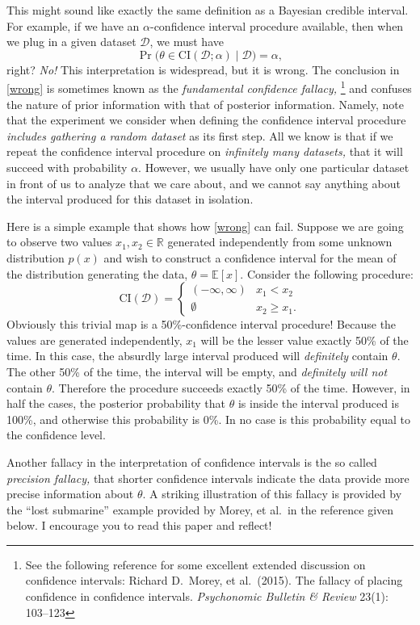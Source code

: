\documentclass{article}
\newcommand{\given}{\mid}
\newcommand{\mc}[1]{\mathcal{#1}}
\newcommand{\data}{\mc{D}}
\newcommand{\E}{\mathbb{E}}
\newcommand{\R}{\mathbb{R}}
\newcommand{\ci}{\text{CI}}
\begin{document}
This might sound like exactly the same definition as a Bayesian credible
interval. For example, if we have an $\alpha$-confidence interval procedure
available, then when we plug in a given dataset $\data$, we must have
\begin{equation}
  \Pr\bigl(\theta \in \ci(\data; \alpha) \given \data) = \alpha, \tag{$\star$}
  \label{wrong}
\end{equation}
right? \emph{No!} This interpretation is widespread, but it is wrong.  The
conclusion in \eqref{wrong} is sometimes known as the \emph{fundamental
  confidence fallacy,}%
%
\footnote{See the following reference for some excellent extended discussion on
  confidence intervals:  Richard D.\ Morey, et al.\ (2015). The fallacy of placing
  confidence in confidence intervals. \emph{Psychonomic Bulletin \& Review}
  23(1): 103--123}
%
and confuses the nature of prior information with that of posterior
information. Namely, note that the experiment we consider when defining the
confidence interval procedure \emph{includes gathering a random dataset} as its
first step. All we know is that if we repeat the confidence interval procedure
on \emph{infinitely many datasets,} that it will succeed with probability
$\alpha$. However, we usually have only one particular dataset in front of us to
analyze that we care about, and we cannot say anything about the interval
produced for this dataset in isolation.

Here is a simple example that shows how \eqref{wrong} can fail. Suppose we are
going to observe two values $x_1, x_2 \in \R$ generated independently from some
unknown distribution $p(x)$ and wish to construct a confidence interval for the
mean of the distribution generating the data, $\theta = \E[x]$. Consider the
following procedure:
\[
  \ci(\data) =
  \begin{cases}
    (-\infty, \infty) & x_1  <   x_2 \\
    \emptyset         & x_2 \geq x_1.
  \end{cases}
\]
Obviously this trivial map is a 50\%-confidence interval procedure! Because the
values are generated independently, $x_1$ will be the lesser value exactly 50\%
of the time.  In this case, the absurdly large interval produced will
\emph{definitely} contain $\theta$.  The other 50\% of the time, the interval
will be empty, and \emph{definitely will not} contain $\theta$. Therefore the
procedure succeeds exactly 50\% of the time. However, in half the cases, the
posterior probability that $\theta$ is inside the interval produced is 100\%,
and otherwise this probability is 0\%. In no case is this probability equal to
the confidence level.

Another fallacy in the interpretation of confidence intervals is the so called
\emph{precision fallacy,} that shorter confidence intervals indicate the data
provide more precise information about $\theta$. A striking illustration of this
fallacy is provided by the ``lost submarine'' example provided by Morey, et
al.\ in the reference given below. I encourage you to read this paper and
reflect!
\end{document}
